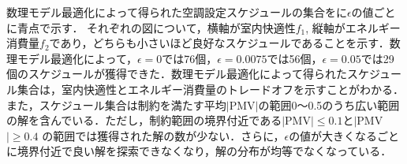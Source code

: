 数理モデル最適化によって得られた空調設定スケジュールの集合をに$\epsilon$の値ごとに青点で示す．
それぞれの図について，横軸が室内快適性$f_1$, 縦軸がエネルギー消費量$f_2$であり，どちらも小さいほど良好なスケジュールであることを示す．数理モデル最適化によって，$\epsilon=0$では76個，$\epsilon=0.0075$では56個，$\epsilon=0.05$では29個のスケジュールが獲得できた．数理モデル最適化によって得られたスケジュール集合は，室内快適性とエネルギー消費量のトレードオフを示すことがわかる．また，スケジュール集合は制約を満たす平均$|$PMV$|$の範囲0～0.5のうち広い範囲の解を含んでいる．ただし，制約範囲の境界付近である$|$PMV$|\leq 0.1$と$|$PMV$|\geq 0.4$ の範囲では獲得された解の数が少ない．さらに，$\epsilon$の値が大きくなるごとに境界付近で良い解を探索できなくなり，解の分布が均等でなくなっている．

